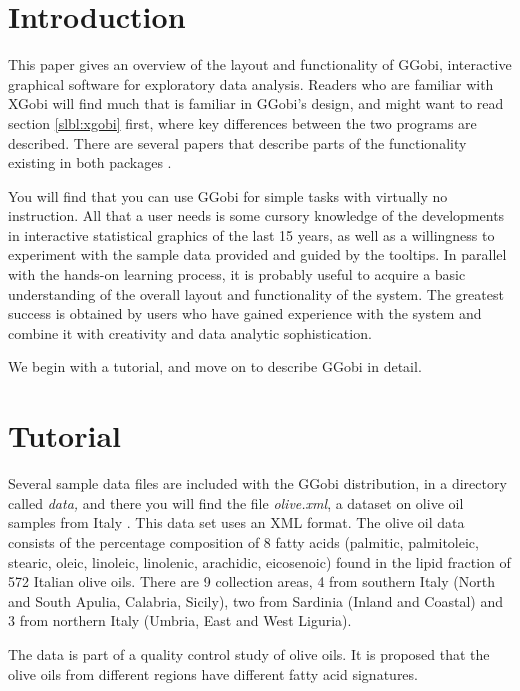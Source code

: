 \documentclass[11pt]{article}
\def\File#1{\textsl{#1}}
\begin{document}
\section{Introduction}

This paper gives an overview of the layout and functionality of GGobi,
interactive graphical software for exploratory data analysis.  Readers
who are familiar with XGobi will find much that is familiar in GGobi's
design, and might want to read section \ref{slbl:xgobi} first, where
key differences between the two programs are described. There are
several papers that describe parts of the functionality existing in
both packages
\cite{BCS95,SCB97,SB98,BAHM88,CBC93,CBCH95,CB95,BCAH95c}.

You will find that you can use GGobi for simple tasks with virtually
no instruction.  All that a user needs is some cursory knowledge of
the developments in interactive statistical graphics of the last 15
years, as well as a willingness to experiment with the sample data
provided and guided by the tooltips.  In parallel with the hands-on
learning process, it is probably useful to acquire a basic
understanding of the overall layout and functionality of the system.
The greatest success is obtained by users who have gained experience
with the system and combine it with creativity and data analytic
sophistication.

We begin with a tutorial, and move on to describe GGobi in detail.

\section{Tutorial}

Several sample data files are included with the GGobi distribution, in
a directory called \File{data,} and there you will find the file
\File{olive.xml}, a dataset on olive oil samples from Italy
\cite{FALT83}.  This data set uses an XML format.  The olive oil data
consists of the percentage composition of 8 fatty acids (palmitic,
palmitoleic, stearic, oleic, linoleic, linolenic, arachidic,
eicosenoic) found in the lipid fraction of 572 Italian olive
oils. There are 9 collection areas, 4 from southern Italy (North and
South Apulia, Calabria, Sicily), two from Sardinia (Inland and
Coastal) and 3 from northern Italy (Umbria, East and West Liguria).

The data is part of a quality control study of olive oils. It is proposed
that the olive oils from different regions have different fatty acid
signatures.
\end{document}

